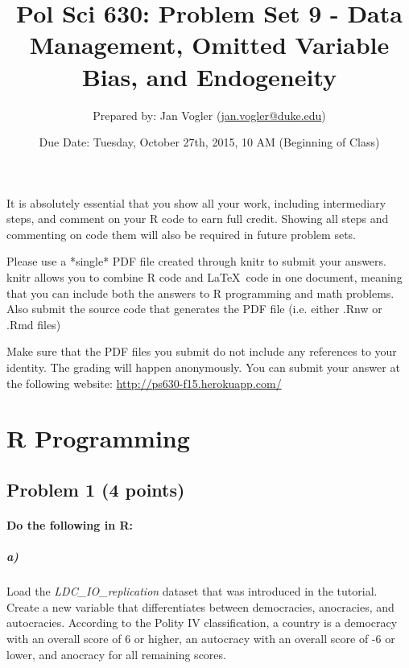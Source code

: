 \documentclass[12pt]{article}
\begin{document}
\title{Pol Sci 630: Problem Set 9 - Data Management, Omitted Variable Bias, and Endogeneity}

\author{Prepared by: Jan Vogler (\href{mailto:jan.vogler@duke.edu}{jan.vogler@duke.edu})}

\date{Due Date: Tuesday, October 27th, 2015, 10 AM (Beginning of Class)}
 
\maketitle 



It is absolutely essential that you show all your work, including intermediary steps, and comment on your R code to earn full credit. Showing all steps and commenting on code them will also be required in future problem sets.

Please use a *single* PDF file created through knitr to submit your answers. knitr allows you to combine R code and \LaTeX \ code in one document, meaning that you can include both the answers to R programming and math problems. Also submit the source code that generates the PDF file (i.e. either .Rnw or .Rmd files)

Make sure that the PDF files you submit do not include any references to your identity. The grading will happen anonymously. You can submit your answer at the following website: \url{http://ps630-f15.herokuapp.com/}



\section*{R Programming}

\subsection*{Problem 1 (4 points)}

\paragraph{Do the following in R:}

\subparagraph{a)} Load the \textit{LDC\_IO\_replication} dataset that was introduced in the tutorial. Create a new variable that differentiates between democracies, anocracies, and autocracies. According to the Polity IV classification, a country is a democracy with an overall score of 6 or higher, an autocracy with an overall score of -6 or lower, and anocracy for all remaining scores.
\end{document}
